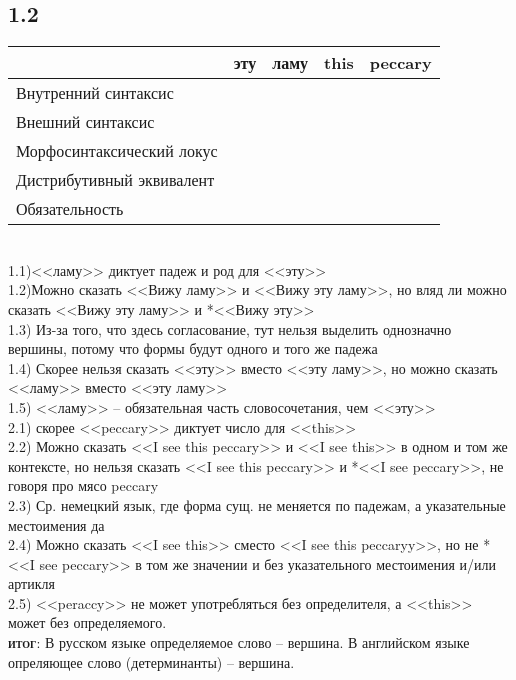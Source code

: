 \documentclass[14pt,extrafontsizes]{article}
\begin{document}
\subsection*{1.2}
\begin{tabular}{||l||ll|ll||}
    \hline
     & \textbf{эту} & \textbf{ламу} & \textbf{this} & \textbf{peccary}\\
         \hline
         Внутренний синтаксис& \cellcolor{red} & \cellcolor{green} & \cellcolor{red} & \cellcolor{green}\\
         Внешний синтаксис& \cellcolor{yellow} & \cellcolor{green} & \cellcolor{green} & \cellcolor{red}\\
         Морфосинтаксический локус& \cellcolor{red} & \cellcolor{red} & \cellcolor{green} & \cellcolor{red}\\
         Дистрибутивный эквивалент& \cellcolor{yellow} & \cellcolor{green} & \cellcolor{green} & \cellcolor{red}\\
         Обязательность& \cellcolor{red} & \cellcolor{green} & \cellcolor{green} & \cellcolor{red}\\
    \hline
\end{tabular}\\
1.1)<<ламу>> диктует падеж и род для <<эту>>\\
1.2)Можно сказать <<Вижу ламу>> и <<Вижу эту ламу>>, но вляд ли можно сказать <<Вижу эту ламу>> и *<<Вижу эту>>\\
1.3) Из-за того, что здесь согласование, тут нельзя выделить однозначно вершины, потому что формы будут одного и того же падежа\\
1.4) Скорее нельзя сказать <<эту>> вместо <<эту ламу>>, но можно сказать <<ламу>> вместо <<эту ламу>>\\
1.5) <<ламу>> -- обязательная часть словосочетания, чем <<эту>>\\
2.1) скорее <<peccary>> диктует число для <<this>>\\
2.2) Можно сказать <<I see this peccary>> и <<I see this>> в одном и том же контексте, но нельзя сказать <<I see this peccary>> и *<<I see peccary>>, не говоря про мясо peccary\\
2.3) Ср. немецкий язык, где форма сущ. не меняется по падежам, а указательные местоимения да\\
2.4) Можно сказать <<I see this>> сместо <<I see this peccaryy>>, но не *<<I see peccary>> в том же значении и без указательного местоимения и/или артикля\\
2.5) <<peraccy>> не может употребляться без определителя, а <<this>> может без определяемого.\\
\textsc{\textbf{итог}}: В русском языке определяемое слово -- вершина. В английском языке опреляющее слово (детерминанты) -- вершина.
\end{document}
